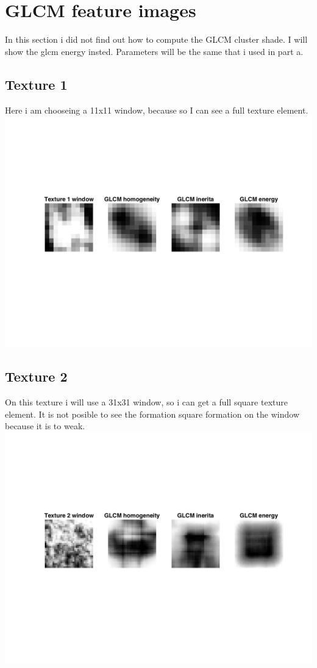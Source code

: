 \documentclass{article}
\begin{document}
\section{GLCM feature images}
In this section i did not find out how to compute the GLCM cluster shade. I will show the glcm energy insted. Parameters will be the same that i used in part a. 
\subsection{Texture 1}
Here i am chooseing a 11x11 window, because so I can see a full texture element. \\
\includegraphics[trim=75 140 0 140,clip,totalheight=5cm]{tw1plot.png}

\subsection{Texture 2}
On this texture i will use a 31x31 window, so i can get  a full square texture element. 
It is not posible to see the formation square formation on the window because it is to weak.\\
\includegraphics[trim=75 140 0 140,clip,totalheight=5cm]{tw2plot.png}
\end{document}
